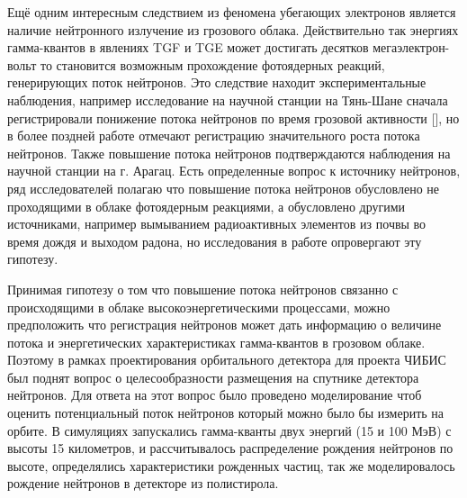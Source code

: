 Ещё одним интересным следствием из феномена убегающих электронов является наличие нейтронного излучение из грозового облака. Действительно так энергиях гамма-квантов в явлениях TGF и TGE может достигать десятков мегаэлектрон-вольт то становится возможным прохождение фотоядерных реакций, генерирующих поток нейтронов. Это следствие находит экспериментальные наблюдения, например исследование на научной станции на Тянь-Шане сначала регистрировали понижение потока нейтронов по время грозовой активности [], но в более поздней работе отмечают регистрацию значительного роста потока нейтронов. Также повышение потока нейтронов подтверждаются наблюдения на научной станции на г. Арагац. Есть определенные вопрос к источнику нейтронов, ряд исследователей полагаю что повышение потока нейтронов обусловлено не проходящими в облаке фотоядерным реакциями, а обусловлено другими источниками, например вымыванием радиоактивных элементов из почвы во время дождя и выходом радона, но исследования в работе опровергают эту гипотезу.

Принимая гипотезу о том что повышение потока нейтронов связанно с происходящими в облаке высокоэнергетическими процессами, можно предположить что регистрация нейтронов может дать информацию о величине потока и энергетических характеристиках гамма-квантов в грозовом облаке. Поэтому в рамках проектирования орбитального детектора для проекта ЧИБИС был поднят вопрос о целесообразности размещения на спутнике детектора нейтронов. Для ответа на этот вопрос было проведено моделирование чтоб оценить потенциальный поток нейтронов который можно было бы измерить на орбите. В симуляциях запускались гамма-кванты двух энергий  (15 и 100 МэВ) с высоты 15 километров, и рассчитывалось распределение рождения нейтронов по высоте, определялись характеристики рожденных частиц, так же моделировалось рождение нейтронов в детекторе из полистирола. 

